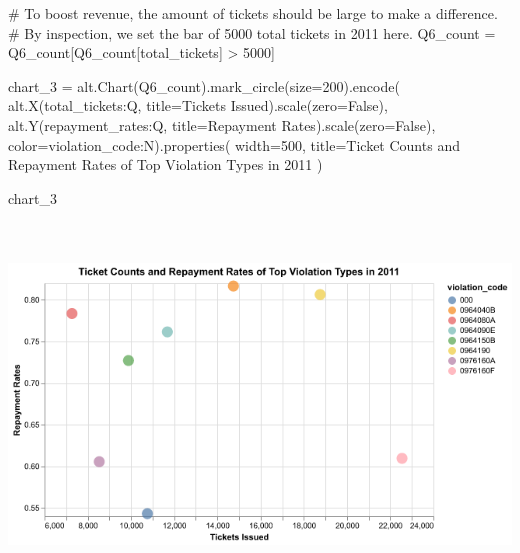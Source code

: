 \documentclass[
  letterpaper,
  DIV=11,
  numbers=noendperiod]{scrartcl}
\newenvironment{Shaded}{\begin{snugshade}}{\end{snugshade}}
\newcommand{\CommentTok}[1]{\textcolor[rgb]{0.37,0.37,0.37}{#1}}
\newcommand{\DecValTok}[1]{\textcolor[rgb]{0.68,0.00,0.00}{#1}}
\newcommand{\NormalTok}[1]{\textcolor[rgb]{0.00,0.23,0.31}{#1}}
\newcommand{\OperatorTok}[1]{\textcolor[rgb]{0.37,0.37,0.37}{#1}}
\newcommand{\StringTok}[1]{\textcolor[rgb]{0.13,0.47,0.30}{#1}}
\newcommand{\VariableTok}[1]{\textcolor[rgb]{0.07,0.07,0.07}{#1}}
\begin{document}
\begin{Shaded}
\begin{Highlighting}[]
\CommentTok{\# To boost revenue, the amount of tickets should be large to make a difference.}
\CommentTok{\# By inspection, we set the bar of 5000 total tickets in 2011 here.}
\NormalTok{Q6\_count }\OperatorTok{=}\NormalTok{ Q6\_count[Q6\_count[}\StringTok{\textquotesingle{}total\_tickets\textquotesingle{}}\NormalTok{] }\OperatorTok{\textgreater{}} \DecValTok{5000}\NormalTok{]}

\NormalTok{chart\_3 }\OperatorTok{=}\NormalTok{ alt.Chart(Q6\_count).mark\_circle(size}\OperatorTok{=}\DecValTok{200}\NormalTok{).encode(}
\NormalTok{    alt.X(}\StringTok{\textquotesingle{}total\_tickets:Q\textquotesingle{}}\NormalTok{, title}\OperatorTok{=}\StringTok{\textquotesingle{}Tickets Issued\textquotesingle{}}\NormalTok{).scale(zero}\OperatorTok{=}\VariableTok{False}\NormalTok{),}
\NormalTok{    alt.Y(}\StringTok{\textquotesingle{}repayment\_rates:Q\textquotesingle{}}\NormalTok{, title}\OperatorTok{=}\StringTok{\textquotesingle{}Repayment Rates\textquotesingle{}}\NormalTok{).scale(zero}\OperatorTok{=}\VariableTok{False}\NormalTok{),}
\NormalTok{    color}\OperatorTok{=}\StringTok{\textquotesingle{}violation\_code:N\textquotesingle{}}\NormalTok{).properties(}
\NormalTok{    width}\OperatorTok{=}\DecValTok{500}\NormalTok{,}
\NormalTok{    title}\OperatorTok{=}\StringTok{\textquotesingle{}Ticket Counts and Repayment Rates of Top Violation Types in 2011\textquotesingle{}}
\NormalTok{)}

\NormalTok{chart\_3}
\end{Highlighting}
\end{Shaded}

\includegraphics[width=6.75in,height=3.78125in]{PS2 Answer_files/figure-pdf/cell-13-output-1.png}
\end{document}
